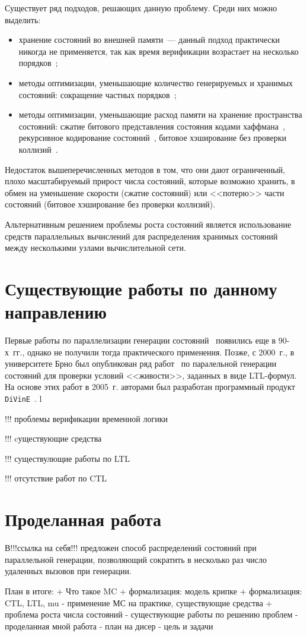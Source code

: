 \documentclass[a4paper,notitlepage,14pt]{article}
\begin{document}
Существует ряд подходов, решающих данную проблему. Среди них можно выделить:

\begin{itemize}
\item хранение состояний во внешней памяти~--- данный подход практически никогда не
  применяется, так как время верификации возрастает на несколько порядков~\cite{Clarke};
\item методы оптимизации, уменьшающие количество генерируемых и хранимых состояний:
  сокращение частных порядков~\cite{POD};
\item методы оптимизации, уменьшающие расход памяти на хранение пространства состояний:
  сжатие битового представления состояния кодами хаффмана~\cite{StateCompr}, рекурсивное
  кодирование состояний~\cite{StateCompr}, битовое хэширование без проверки
  коллизий~\cite{BitHash1,Wolper}.
\end{itemize}

Недостаток вышеперечисленных методов в том, что они дают ограниченный, плохо
масштабируемый прирост числа состояний, которые возможно хранить, в обмен на уменьшение
скорости (сжатие состояний) или <<потерю>> части состояний (битовое хэширование без
проверки коллизий).

Альтернативным решением проблемы роста состояний является использование средств
параллельных вычислений для распределения хранимых состояний между несколькими узлами
вычислительной сети.

\section{Существующие работы по данному направлению}
\label{sec:other-work}

Первые работы по параллелизации генерации состояний~\cite{LS99} появились еще в 90-х~гг.,
однако не получили тогда практического применения. Позже, с 2000~г., в университете Брно
был опубликован ряд работ~\cite{DLTL1,DLTL2} по паралельной генерации состояний для
проверки условий <<живости>>, заданных в виде LTL-формул. На основе этих работ в
2005~г. авторами был разработан программный продукт \texttt{DiVinE}~\cite{DiVinE}.
l

!!! проблемы верификации временной логики

!!! cуществующие средства

!!! существулющие работы по LTL

!!! отсутствие работ по CTL

\section{Проделанная работа}
\label{sec:my-work}

В!!!ссылка на себя!!! предложен способ распределений состояний при параллельной генерации,
позволяющий сократить в несколько раз число удаленных вызовов при генерации.

План в итоге:
+ Что такое MC
+ формализация: модель крипке
+ формализация: CTL, LTL, mu
- применение МС на практике, существующие средства
+ проблема роста числа состояний
- существующие работы по решению проблем
- проделанная мной работа
- план на дисер
- цель и задачи



\end{document}
